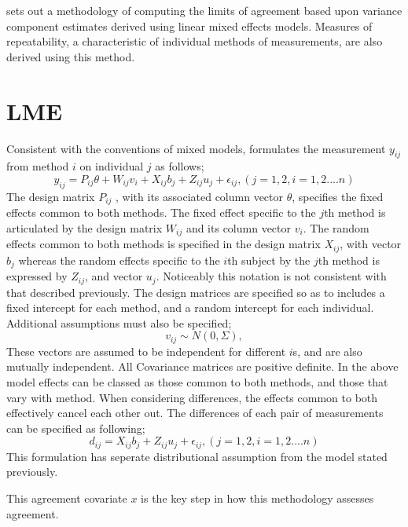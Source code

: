 \documentclass{report}
\begin{document}
	\citet{BXC2008} sets out a methodology of computing the limits of
	agreement based upon variance component estimates derived using
	linear mixed effects models. Measures of repeatability, a
	characteristic of individual methods of measurements, are also
	derived using this method.
	
	
	\section{LME}
	Consistent with the conventions of mixed models, \citet{pkc}
	formulates the measurement $y_{ij} $from method $i$ on individual
	$j$ as follows;
	\begin{equation}
	y_{ij} =P_{ij}\theta + W_{ij}v_{i} + X_{ij}b_{j} + Z_{ij}u_{j} +
	\epsilon_{ij},     (j=1,2, i=1,2....n)
	\end{equation}
	The design matrix $P_{ij}$ , with its associated column vector
	$\theta$, specifies the fixed effects common to both methods. The
	fixed effect specific to the $j$th method is articulated by the
	design matrix $W_{ij}$ and its column vector $v_{i}$. The random
	effects common to both methods is specified in the design matrix
	$X_{ij}$, with vector $b_{j}$ whereas the random effects specific
	to the $i$th subject by the $j$th method is expressed by $Z_{ij}$,
	and vector $u_{j}$. Noticeably this notation is not consistent
	with that described previously.  The design matrices are specified
	so as to includes a fixed intercept for each method, and a random
	intercept for each individual. Additional assumptions must also be
	specified;
	\begin{equation}
	v_{ij} \sim N(0,\Sigma),
	\end{equation}
	These vectors are assumed to be independent for different $i$s,
	and are also mutually independent. All Covariance matrices are
	positive definite.  In the above model effects can be classed as
	those common to both methods, and those that vary with method.
	When considering differences, the effects common to both
	effectively cancel each other out. The differences of each pair of
	measurements can be specified as following;
	\begin{equation}
	d_{ij} = X_{ij}b_{j} + Z_{ij}u_{j} + \epsilon_{ij},     (j=1,2,
	i=1,2....n)
	\end{equation}
	This formulation has seperate distributional assumption from the
	model stated previously.
	
	This agreement covariate $x$ is the key step in how this
	methodology assesses agreement.
\end{document}
